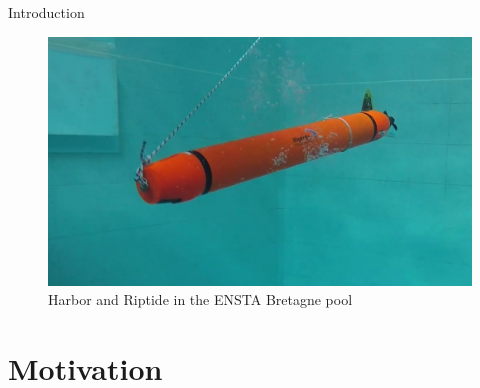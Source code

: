 \documentclass[10pt, xcolor={usenames, dvipsnames}]{beamer}
\begin{document}
\begin{frame}{Introduction}
\begin{minipage}[t]{0.4\textwidth}
\begin{figure}[htb]
                    \vspace{.1cm}

                    \includegraphics[width=\textwidth]{imgs/riptide.png}
                    \caption{Harbor and Riptide in the ENSTA Bretagne pool}
                \end{figure}
            \end{minipage}
        \end{frame}

    \section{Motivation}
\end{document}
